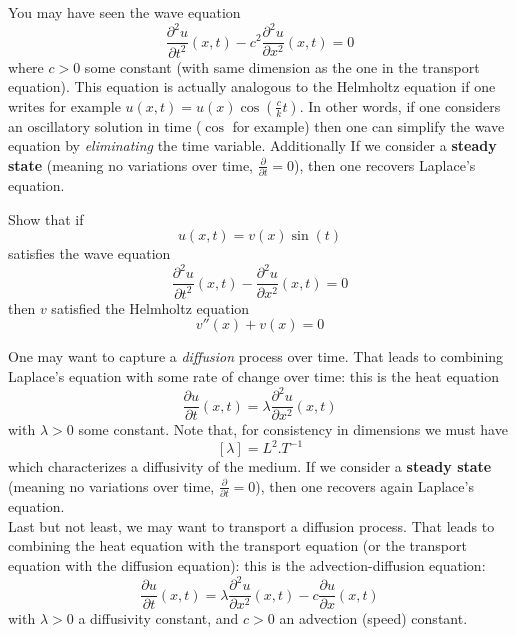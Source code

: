 You may have seen the wave equation
\[ \displaystyle \frac{\partial^2 u}{\partial t^2}(x,t) -  c^2 \frac{\partial^2 u}{\partial x^2}(x,t) = 0 \]
where $c>0$ some constant (with same dimension as the one in the transport equation). This equation is actually analogous to the Helmholtz equation if one writes for example $u(x,t) = u(x)\cos(\frac{c}{k} t)$. In other words, if one considers an oscillatory solution in time ($\cos$ for example) then one can simplify the wave equation by \textit{eliminating} the time variable. Additionally If we consider a \textbf{steady state} (meaning no variations over time, $ \frac{\partial }{\partial t} = 0$), then one recovers Laplace's equation.
\begin{Exercise}
Show that if 
\[ u(x,t) = v(x)\sin(t)\]
satisfies the wave equation
\[ \displaystyle \frac{\partial^2 u}{\partial t^2}(x,t) - \frac{\partial^2 u}{\partial x^2}(x,t) = 0 \]
then $v$ satisfied the Helmholtz equation
\[  v''(x) + v(x) = 0\]
  \dotfill

\dotfill

\dotfill

\dotfill

\dotfill

\dotfill

\dotfill

\dotfill

\dotfill

\dotfill
\end{Exercise}
One may want to capture a \textit{diffusion} process over time. That leads to combining Laplace's equation with some rate of change over time: this is the heat equation
\[ \displaystyle \frac{\partial u}{\partial t}(x,t)  =  \lambda \frac{\partial^2 u}{\partial x^2}(x,t) \]
with $\lambda >0$ some constant. Note that, for consistency in dimensions we must have
\[ [\lambda] = L^2. T^{-1}\]
which characterizes a diffusivity of the medium. If we consider a \textbf{steady state} (meaning no variations over time, $ \frac{\partial }{\partial t} = 0$), then one recovers again Laplace's equation.\\
Last but not least, we may want to transport a diffusion process. That leads to combining the heat equation with the transport equation (or the transport equation with the diffusion equation): this is the advection-diffusion equation:
\[ \displaystyle \frac{\partial u}{\partial t}(x,t)  =  \lambda \frac{\partial^2 u}{\partial x^2}(x,t) - c \frac{\partial u}{\partial x}(x,t) \]
with $\lambda >0$ a diffusivity constant, and $c >0$ an advection (speed) constant.\\
